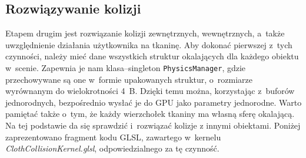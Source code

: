 		\subsection{Rozwiązywanie kolizji}
		\label{t:symulacja:dzialanie:kolizje}
			
		
		Etapem drugim jest rozwiązanie kolizji zewnętrznych, wewnętrznych, a~także uwzględnienie działania użytkownika na tkaninę. Aby dokonać pierwszej z~tych czynności, należy mieć dane wszystkich struktur okalających dla każdego obiektu w~scenie. Zapewnia je nam klasa--singleton \texttt{PhysicsManager}, gdzie przechowywane są one w~formie upakowanych struktur, o~rozmiarze wyrównanym do wielokrotności 4~B. Dzięki temu można, korzystając z~buforów jednorodnych, bezpośrednio wysłać je do GPU jako parametry jednorodne. Warto pamiętać także o~tym, że każdy wierzchołek tkaniny ma własną sferę okalającą. Na tej podstawie da się sprawdzić i~rozwiązać kolizje z innymi obiektami. Poniżej zaprezentowano fragment kodu GLSL, zawartego w~kernelu \emph{ClothCollisionKernel.glsl}, odpowiedzialnego za tę czynność.
		
